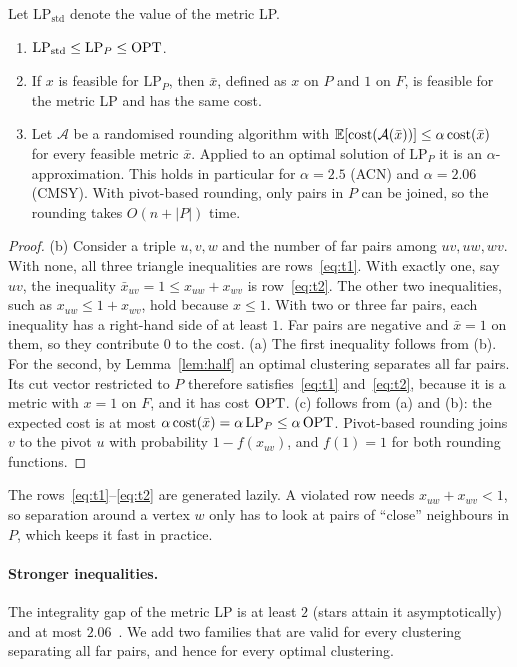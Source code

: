 \begin{theorem}\label{thm:sparse}
Let $\mathrm{LP}_{\mathrm{std}}$ denote the value of the metric LP.
\begin{enumerate}
\item[(a)] $\mathrm{LP}_{\mathrm{std}}\le \mathrm{LP}_P\le\mathrm{OPT}$.
\item[(b)] If $x$ is feasible for $\mathrm{LP}_P$, then $\bar x$, defined as $x$ on
$P$ and $1$ on $F$, is feasible for the metric LP and has the same cost.
\item[(c)] Let $\mathcal A$ be a randomised rounding algorithm with
$\mathbb E[\mathrm{cost}(\mathcal A(\bar x))]\le\alpha\,\mathrm{cost}(\bar x)$ for every
feasible metric $\bar x$.  Applied to an optimal solution of $\mathrm{LP}_P$ it
is an $\alpha$-approximation.  This holds in particular for $\alpha=2.5$
(ACN) and $\alpha=2.06$ (CMSY).  With pivot-based rounding, only pairs in
$P$ can be joined, so the rounding takes $O(n+|P|)$ time.
\end{enumerate}
\end{theorem}
\begin{proof}
(b) Consider a triple $u,v,w$ and the number of far pairs among $uv,uw,wv$.
With none, all three triangle inequalities are rows~\eqref{eq:t1}.  With
exactly one, say $uv$, the inequality $\bar x_{uv}=1\le x_{uw}+x_{wv}$ is
row~\eqref{eq:t2}.  The other two inequalities, such as
$x_{uw}\le 1+x_{wv}$, hold because $x\le 1$.  With two or three far pairs, each
inequality has a right-hand side of at least $1$.  Far pairs are negative and
$\bar x=1$ on them, so they contribute $0$ to the cost.  (a) The first
inequality follows from (b).  For the second, by Lemma~\ref{lem:half} an
optimal clustering separates all far pairs.  Its cut vector restricted to $P$
therefore satisfies~\eqref{eq:t1} and~\eqref{eq:t2}, because it is a metric
with $x=1$ on $F$, and it has cost $\mathrm{OPT}$.  (c) follows from (a) and (b): the
expected cost is at most $\alpha\,\mathrm{cost}(\bar x)=\alpha\,\mathrm{LP}_P
\le\alpha\,\mathrm{OPT}$.  Pivot-based rounding joins $v$ to the pivot $u$ with
probability $1-f(x_{uv})$, and $f(1)=1$ for both rounding functions.
\end{proof}

The rows~\eqref{eq:t1}--\eqref{eq:t2} are generated lazily.  A violated row
needs $x_{uw}+x_{wv}<1$, so separation around a vertex $w$ only has to look at
pairs of ``close'' neighbours in $P$, which keeps it fast in practice.

\paragraph{Stronger inequalities.}  The integrality gap of the metric LP is
at least $2$ (stars attain it asymptotically) and at most
$2.06$~\citep{ChawlaMSY15}.  We add two families that are valid for every clustering
separating all far pairs, and hence for every optimal clustering.

